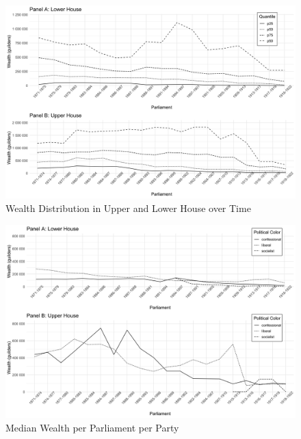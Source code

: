 \begin{landscape}
\begin{figure}
    \centering
    \includegraphics[scale=0.17]{figures/step5fig2wealthperparl.png}
    \caption{Wealth Distribution in Upper and Lower House over Time}
    \label{fig:avgwealthtime}
\end{figure}
\end{landscape}
\clearpage

\begin{landscape}
\begin{figure}
    \centering
    \includegraphics[scale=0.17]{figures/step8fig2wealthperparlperparty.png}
    \caption{Median Wealth per Parliament per Party}
    \label{fig:avgwealthtimeparty}
\end{figure}
\end{landscape}
\clearpage

